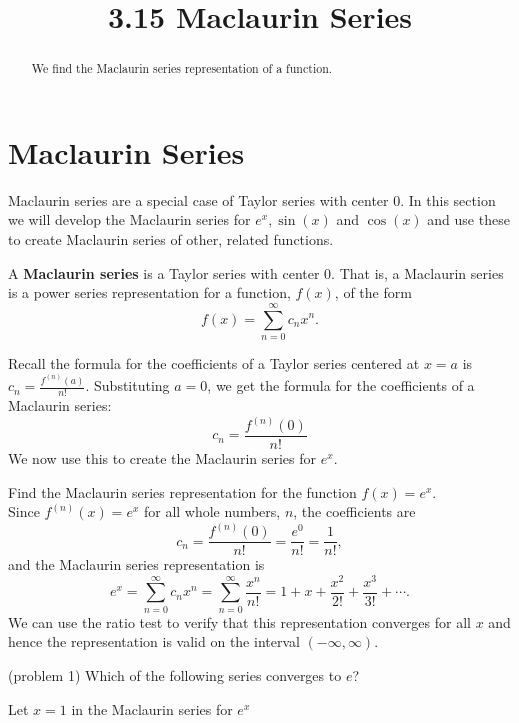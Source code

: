 \documentclass{ximera}
\title{3.15 Maclaurin Series}
\begin{document}
\begin{abstract}
We find the Maclaurin series representation of a function.
\end{abstract}

\maketitle

\section{Maclaurin Series}


Maclaurin series are a special case of Taylor series with center $0$. In this section we will develop the Maclaurin series for 
$e^x, \sin(x)$ and $\cos(x)$ and use these to create Maclaurin series of other, related functions.

\begin{definition} 
A \textbf{Maclaurin series} is a Taylor series with center 0. That is, a Maclaurin series is a power series representation 
for a function, $f(x)$, of the form
\[
f(x) = \sum_{n=0}^\infty c_n x^n.
\]
\end{definition}
 
Recall the formula for the coefficients of a Taylor series centered at $x = a$ is $\displaystyle c_n = \frac{f^{(n)}(a)}{n!}$.
Substituting $a = 0$, we get the formula for the coefficients of a Maclaurin series:
\[
c_n = \frac{f^{(n)}(0)}{n!}
\]
We now use this to create the Maclaurin series for $e^x$.
\begin{example} 
Find the Maclaurin series representation for the function $f(x) = e^x$.\\
Since $f^{(n)}(x) = e^x$ for all whole numbers, $n$, the coefficients are
\[
c_n = \frac{f^{(n)}(0)}{n!} = \frac{e^0}{n!} = \frac{1}{n!},
\]
and the Maclaurin series representation is 
\[
e^x = \sum_{n=0}^\infty c_n x^n = \sum_{n=0}^\infty \frac{x^n}{n!} = 1 + x + \frac{x^2}{2!} + \frac{x^3}{3!} + \cdots.
\]
We can use the ratio test to verify that this representation converges for all $x$ and 
hence the representation is valid on the interval $(-\infty, \infty)$.
\end{example}

\begin{problem}(problem 1)
Which of the following series converges to $e$?
\begin{hint}
Let $x = 1$ in the Maclaurin series for $e^x$
\end{hint}

\begin{multipleChoice}
\end{multipleChoice}
\end{problem}
\end{document}
